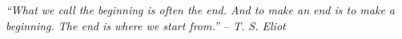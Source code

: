 \documentclass{book}
\begin{document}
%
%
%

\mainmatter
\startHW

\pagebreak

\begin{center} 
\emph{``What we call the beginning is often the end. And to make an end is to make a beginning. The end is where we start from.'' -- T. S. Eliot}
\end{center}
\end{document}

